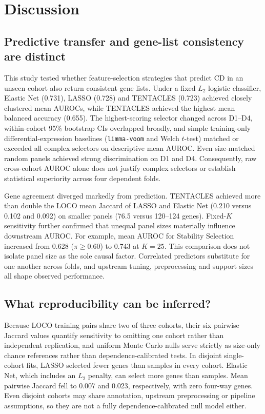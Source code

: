 \section{Discussion}
\label{sec:discussion}
\subsection{Predictive transfer and gene-list consistency are distinct}
\label{sec:discussion_tradeoff}
This study tested whether feature-selection strategies that predict CD in an unseen cohort also return consistent gene lists. Under a fixed $L_2$ logistic classifier, Elastic Net (0.731), LASSO (0.728) and TENTACLES (0.723) achieved closely clustered mean AUROCs, while TENTACLES achieved the highest mean balanced accuracy (0.655). The highest-scoring selector changed across D1--D4, within-cohort 95\% bootstrap CIs overlapped broadly, and simple training-only differential-expression baselines (\texttt{limma-voom} and Welch $t$-test) matched or exceeded all complex selectors on descriptive mean AUROC. Even size-matched random panels achieved strong discrimination on D1 and D4. Consequently, raw cross-cohort AUROC alone does not justify complex selectors or establish statistical superiority across four dependent folds.

Gene agreement diverged markedly from prediction. TENTACLES achieved more than double the LOCO mean Jaccard of LASSO and Elastic Net (0.210 versus 0.102 and 0.092) on smaller panels (76.5 versus 120--124 genes). Fixed-$K$ sensitivity further confirmed that unequal panel sizes materially influence downstream AUROC. For example, mean AUROC for Stability Selection increased from 0.628 ($\pi \ge 0.60$) to 0.743 at $K=25$. This comparison does not isolate panel size as the sole causal factor. Correlated predictors substitute for one another across folds, and upstream tuning, preprocessing and support sizes all shape observed performance.

\subsection{What reproducibility can be inferred?}
\label{sec:discussion_reproducibility}
Because LOCO training pairs share two of three cohorts, their six pairwise Jaccard values quantify sensitivity to omitting one cohort rather than independent replication, and uniform Monte Carlo nulls serve strictly as size-only chance references rather than dependence-calibrated tests. In disjoint single-cohort fits, LASSO selected fewer genes than samples in every cohort. Elastic Net, which includes an $L_2$ penalty, can select more genes than samples. Mean pairwise Jaccard fell to 0.007 and 0.023, respectively, with zero four-way genes. Even disjoint cohorts may share annotation, upstream preprocessing or pipeline assumptions, so they are not a fully dependence-calibrated null model either.

